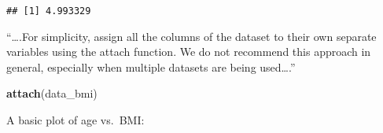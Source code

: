 \documentclass[]{article}
\newenvironment{Shaded}{\begin{snugshade}}{\end{snugshade}}
\newcommand{\CommentTok}[1]{\textcolor[rgb]{0.56,0.35,0.01}{\textit{#1}}}
\newcommand{\KeywordTok}[1]{\textcolor[rgb]{0.13,0.29,0.53}{\textbf{#1}}}
\newcommand{\NormalTok}[1]{#1}
\newcommand{\OperatorTok}[1]{\textcolor[rgb]{0.81,0.36,0.00}{\textbf{#1}}}
\begin{document}
\begin{Shaded}
\end{Shaded}

\begin{verbatim}
## [1] 4.993329
\end{verbatim}

``\ldots{}.For simplicity, assign all the columns of the dataset to
their own separate variables using the attach function. We do not
recommend this approach in general, especially when multiple datasets
are being used\ldots{}.''

\begin{Shaded}
\begin{Highlighting}[]
\KeywordTok{attach}\NormalTok{(data_bmi)}
\end{Highlighting}
\end{Shaded}

A basic plot of age vs.~BMI:
\end{document}
